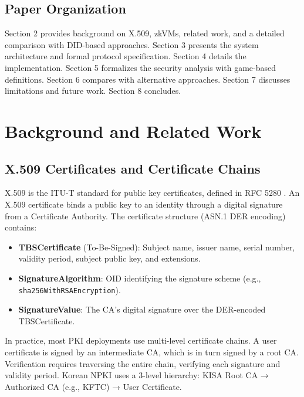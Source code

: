 \documentclass[11pt, a4paper]{article}
\providecommand{\tightlist}{%
  \setlength{\itemsep}{0pt}\setlength{\parskip}{0pt}}
\begin{document}
\subsection{Paper Organization}\label{paper-organization}

Section 2 provides background on X.509, zkVMs, related work, and a
detailed comparison with DID-based approaches. Section 3 presents the
system architecture and formal protocol specification. Section 4 details
the implementation. Section 5 formalizes the security analysis with
game-based definitions. Section 6 compares with alternative approaches.
Section 7 discusses limitations and future work. Section 8 concludes.


\section{Background and Related
Work}\label{background-and-related-work}

\subsection{X.509 Certificates and Certificate
Chains}\label{x.509-certificates-and-certificate-chains}

X.509 is the ITU-T standard for public key certificates, defined in RFC
5280 \cite{ref4}. An X.509 certificate binds a public key to an identity
through a digital signature from a Certificate Authority. The
certificate structure (ASN.1 DER encoding) contains:

\begin{itemize}
\tightlist
\item
  \textbf{TBSCertificate} (To-Be-Signed): Subject name, issuer name,
  serial number, validity period, subject public key, and extensions.
\item
  \textbf{SignatureAlgorithm}: OID identifying the signature scheme
  (e.g., \texttt{sha256WithRSAEncryption}).
\item
  \textbf{SignatureValue}: The CA's digital signature over the
  DER-encoded TBSCertificate.
\end{itemize}

In practice, most PKI deployments use multi-level certificate chains. A
user certificate is signed by an intermediate CA, which is in turn
signed by a root CA. Verification requires traversing the entire chain,
verifying each signature and validity period. Korean NPKI uses a 3-level
hierarchy: KISA Root CA → Authorized CA (e.g., KFTC) → User
Certificate.
\end{document}
